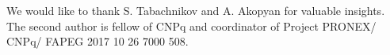 \noindent We would like to thank S. Tabachnikov and A. Akopyan for valuable insights. The second author is fellow of CNPq and coordinator of Project PRONEX/ CNPq/ FAPEG 2017 10 26 7000 508.